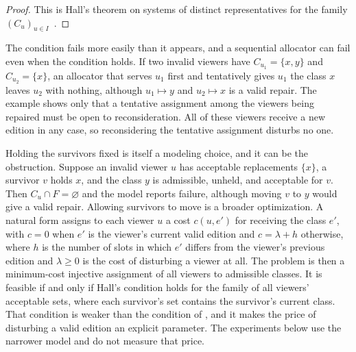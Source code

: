 \documentclass[11pt,twoside,openright]{book}
\theoremstyle{plain}
\theoremstyle{definition}
\theoremstyle{remark}
\begin{document}
\begin{proof}
This is Hall's theorem on systems of distinct representatives for the family $(C_u)_{u\in I}$~\cite{hall1935}.
\end{proof}

The condition fails more easily than it appears, and a sequential allocator can fail even when the condition holds. If two invalid viewers have $C_{u_1}=\{x,y\}$ and $C_{u_2}=\{x\}$, an allocator that serves $u_1$ first and tentatively gives $u_1$ the class $x$ leaves $u_2$ with nothing, although $u_1\mapsto y$ and $u_2\mapsto x$ is a valid repair. The example shows only that a tentative assignment among the viewers being repaired must be open to reconsideration. All of these viewers receive a new edition in any case, so reconsidering the tentative assignment disturbs no one.

Holding the survivors fixed is itself a modeling choice, and it can be the obstruction. Suppose an invalid viewer $u$ has acceptable replacements $\{x\}$, a survivor $v$ holds $x$, and the class $y$ is admissible, unheld, and acceptable for $v$. Then $C_u\cap F=\varnothing$ and the model reports failure, although moving $v$ to $y$ would give a valid repair. Allowing survivors to move is a broader optimization. A natural form assigns to each viewer $u$ a cost $c(u,e')$ for receiving the class $e'$, with $c=0$ when $e'$ is the viewer's current valid edition and $c=\lambda+h$ otherwise, where $h$ is the number of slots in which $e'$ differs from the viewer's previous edition and $\lambda\ge0$ is the cost of disturbing a viewer at all. The problem is then a minimum-cost injective assignment of all viewers to admissible classes. It is feasible if and only if Hall's condition holds for the family of all viewers' acceptable sets, where each survivor's set contains the survivor's current class. That condition is weaker than the condition of , and it makes the price of disturbing a valid edition an explicit parameter. The experiments below use the narrower model and do not measure that price.
\end{document}
